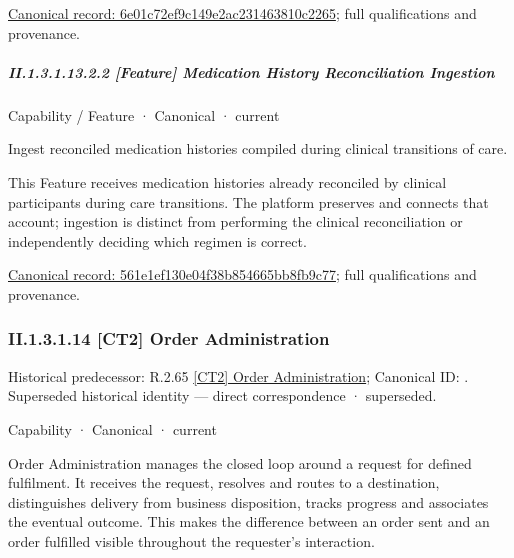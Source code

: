 {\footnotesize \href{../../../../../../../continuum/strategy/capability/feature/6e01c72ef9c149e2ac231463810c2265.md}{Canonical record: 6e01c72ef9c149e2ac231463810c2265}; full qualifications and provenance.}\par
\subparagraph*{II.1.3.1.13.2.2 [Feature] Medication History Reconciliation Ingestion}
\label{navigation:II.1.3.1.13.2.2}

\label{element:561e1ef130e04f38b854665bb8fb9c77}
{\small Capability / Feature · Canonical · current}\par

Ingest reconciled medication histories compiled during clinical transitions of care.



This Feature receives medication histories already reconciled by clinical participants during care transitions. The platform preserves and connects that account; ingestion is distinct from performing the clinical reconciliation or independently deciding which regimen is correct.


{\footnotesize \href{../../../../../../../continuum/strategy/capability/feature/561e1ef130e04f38b854665bb8fb9c77.md}{Canonical record: 561e1ef130e04f38b854665bb8fb9c77}; full qualifications and provenance.}\par
\subsubsection*{II.1.3.1.14 [CT2] Order Administration}
\label{navigation:II.1.3.1.14}

{\small Historical predecessor: R.2.65 \hyperref[element:ebb735a2915744819d4001d9b8425cc6]{[CT2] Order Administration}; Canonical ID: \texttt{}. Superseded historical identity — direct correspondence · superseded.}\par
\label{element:c3c5abd7987f4433a46cbfed8167914c}
{\small Capability · Canonical · current}\par

Order Administration manages the closed loop around a request for defined fulfilment. It receives the request, resolves and routes to a destination, distinguishes delivery from business disposition, tracks progress and associates the eventual outcome. This makes the difference between an order sent and an order fulfilled visible throughout the requester's interaction.



